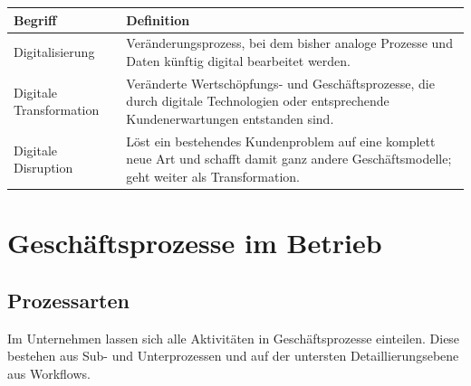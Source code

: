 \documentclass[11pt, a4paper]{article}
\begin{document}
\begin{center}
\begin{tabular}{p{3.5cm} p{9.5cm}}
\toprule
\textbf{Begriff} & \textbf{Definition}\\
\midrule
Digitalisierung & Veränderungsprozess, bei dem bisher analoge Prozesse und Daten künftig digital bearbeitet werden.\\
\addlinespace
Digitale Transformation & Veränderte Wertschöpfungs- und Geschäftsprozesse, die durch digitale Technologien oder entsprechende Kundenerwartungen entstanden sind.\\
\addlinespace
Digitale Disruption & Löst ein bestehendes Kundenproblem auf eine komplett neue Art und schafft damit ganz andere Geschäftsmodelle; geht weiter als Transformation.\\
\bottomrule
\end{tabular}
\end{center}

\section{Geschäftsprozesse im Betrieb}

\subsection{Prozessarten}

Im Unternehmen lassen sich alle Aktivitäten in Geschäftsprozesse einteilen. Diese bestehen
aus Sub- und Unterprozessen und auf der untersten Detaillierungsebene aus Workflows.
\end{document}
